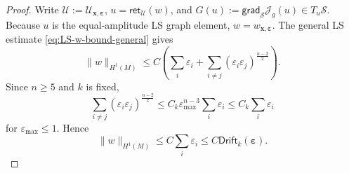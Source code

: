 \documentclass[11pt,reqno,a4paper]{amsart}
\numberwithin{equation}{section}
\theoremstyle{plain}
\theoremstyle{remark}
\theoremstyle{plain}
\begin{document}
\begin{proof}
Write $\mathcal U:=\mathcal U_{\mathbf x,\boldsymbol\varepsilon}$, $u=\mathsf{ret}_{\mathcal U}(w)$,
and $G(u):=\mathsf{grad}_{\mathcal S}\mathcal J_g(u)\in T_u\mathcal S$.
Because $u$ is the equal-amplitude LS graph element, $w=w_{\mathbf x,\boldsymbol\varepsilon}$.
The general LS estimate \eqref{eq:LS-w-bound-general} gives
\[
\|w\|_{H^1(M)}
\le C\left(\sum_i\varepsilon_i+
\sum_{i\ne j}(\varepsilon_i\varepsilon_j)^{\frac{n-2}{2}}\right).
\]
Since $n\ge5$ and $k$ is fixed,
\[
\sum_{i\ne j}(\varepsilon_i\varepsilon_j)^{\frac{n-2}{2}}
\le C_k\varepsilon_{\max}^{n-3}\sum_i\varepsilon_i
\le C_k\sum_i\varepsilon_i
\]
for $\varepsilon_{\max}\le1$.  Hence
\begin{equation}\label{eq:w-small-drift-thmRG}
\|w\|_{H^1(M)}\le C\sum_i\varepsilon_i
\le C\mathsf{Drift}_k(\boldsymbol\varepsilon).
\end{equation}


\end{proof}
\end{document}
